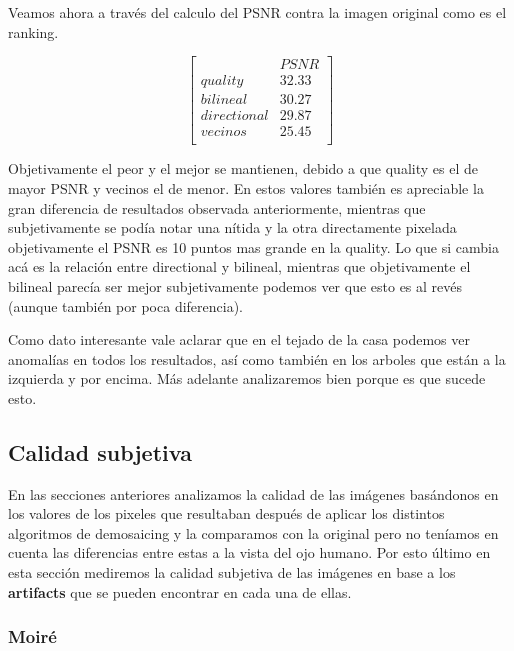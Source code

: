 {Veamos ahora a través del calculo del PSNR contra la imagen original como es el ranking.

$$ 
\begin{bmatrix}
           &      PSNR    \\
       quality    &   32.33   \\
       bilineal    &      30.27   \\
       directional    &      29.87    \\
       vecinos   &      25.45     \\
\end{bmatrix} 
$$

Objetivamente el peor y el mejor se mantienen, debido a que quality es el de mayor PSNR y vecinos el de menor. En estos valores también es apreciable la gran diferencia de resultados observada anteriormente, mientras que subjetivamente se podía notar una nítida y la otra directamente pixelada objetivamente el PSNR es 10 puntos mas grande en la quality. Lo que si cambia acá es la relación entre directional y bilineal, mientras que objetivamente el bilineal parecía ser mejor subjetivamente podemos ver que esto es al revés (aunque también por poca diferencia).

Como dato interesante vale aclarar que en el tejado de la casa podemos ver anomalías en todos los resultados, así como también en los arboles que están a la izquierda y por encima. Más adelante analizaremos bien porque es que sucede esto.


\newpage

\subsection{Calidad subjetiva}

En las secciones anteriores analizamos la calidad de las imágenes basándonos en los valores de los pixeles que resultaban después de aplicar los distintos algoritmos de demosaicing y la comparamos con la original pero no teníamos en cuenta las diferencias entre estas a la vista del ojo humano. Por esto último en esta sección mediremos la calidad subjetiva de las imágenes en base a los \textbf{artifacts} que se pueden encontrar en cada una de ellas.\\

\subsubsection{Moiré}


}
